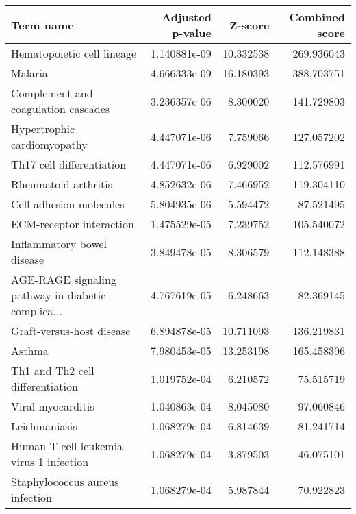 \begin{tabular}{lrrr}
\toprule
                                         Term name &  Adjusted p-value &   Z-score &  Combined score \\
\midrule
                        Hematopoietic cell lineage &      1.140881e-09 & 10.332538 &      269.936043 \\
                                           Malaria &      4.666333e-09 & 16.180393 &      388.703751 \\
               Complement and coagulation cascades &      3.236357e-06 &  8.300020 &      141.729803 \\
                       Hypertrophic cardiomyopathy &      4.447071e-06 &  7.759066 &      127.057202 \\
                         Th17 cell differentiation &      4.447071e-06 &  6.929002 &      112.576991 \\
                              Rheumatoid arthritis &      4.852632e-06 &  7.466952 &      119.304110 \\
                           Cell adhesion molecules &      5.804935e-06 &  5.594472 &       87.521495 \\
                          ECM-receptor interaction &      1.475529e-05 &  7.239752 &      105.540072 \\
                        Inflammatory bowel disease &      3.849478e-05 &  8.306579 &      112.148388 \\
AGE-RAGE signaling pathway in diabetic complica... &      4.767619e-05 &  6.248663 &       82.369145 \\
                         Graft-versus-host disease &      6.894878e-05 & 10.711093 &      136.219831 \\
                                            Asthma &      7.980453e-05 & 13.253198 &      165.458396 \\
                  Th1 and Th2 cell differentiation &      1.019752e-04 &  6.210572 &       75.515719 \\
                                 Viral myocarditis &      1.040863e-04 &  8.045080 &       97.060846 \\
                                     Leishmaniasis &      1.068279e-04 &  6.814639 &       81.241714 \\
           Human T-cell leukemia virus 1 infection &      1.068279e-04 &  3.879503 &       46.075101 \\
                   Staphylococcus aureus infection &      1.068279e-04 &  5.987844 &       70.922823 \\

\end{tabular}
